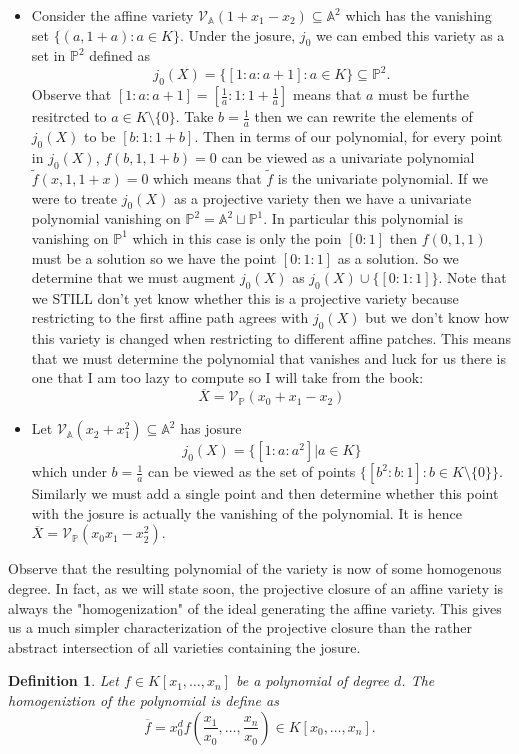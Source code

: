 \documentclass[40pt]{article}
\newtheorem{definition}{Definition}[section]
\newcommand{\Proj}{\mathbb{P}}
\newcommand{\A}{\mathbb{A}}
\newcommand{\V}{\mathcal{V}}
\theoremstyle{remark}
\begin{document}
	\begin{itemize}
		\item Consider the affine variety $\V_\A(1+x_1-x_2) \subseteq \A^2$ which has the vanishing set $\{(a,1+a)  : a \in K\}$. Under the josure, $j_0$ we can embed this variety as a set in $\Proj^2$ defined as
		\[
		j_0(X) = \{[1:a:a+1] : a \in K\} \subseteq \Proj^2.
		\]
		Observe that $[1:a:a+1] = [\frac{1}{a}:1:1 + \frac{1}{a}]$ means that $a$ must be furthe resitrcted to $a \in K\setminus \{0\}$. Take $b = \frac{1}{a}$ then we can rewrite the elements of $j_0(X)$ to be $[b:1:1+b]$. Then in terms of our polynomial, for every point in $j_0(X)$, $f(b,1,1+b) = 0$ can be viewed as a univariate polynomial $\tilde f (x,1,1+x) = 0$ which means that $\tilde f $ is the univariate polynomial. If we were to treate $j_0(X)$ as a projective variety then we have a univariate polynomial vanishing on $\Proj^2 = \A^2 \sqcup \Proj^1$. In particular this polynomial is vanishing on $\Proj^1$ which in this case is
		only the poin $[0:1]$ then $f(0,1,1)$ must be a solution so we have the point $[0:1:1]$ as a solution. So we determine that we must augment $j_0(X)$ as $j_0(X) \cup \{[0:1:1]\}$. Note that we STILL don't yet know whether this is a projective variety because restricting to the first affine path agrees with $j_0(X)$ but we don't know how this variety is changed when restricting to different affine patches. This means that we must determine the polynomial that vanishes and luck for us there is one that I am too lazy to compute so I will take from the book:
		\[\overline X = \V_\Proj(x_0+x_1 - x_2) \]
		\item Let $\V_\A(x_2  +x_1^2) \subseteq\A^2$ has josure
		\[
		j_0(X) = \{[1:a:a^2] | a \in K\}
		\]
		which under $b = \frac{1}{a}$ can be viewed as the set of points $\{[b^2:b:1] : b \in K\setminus \{0\}\}$. Similarly we must add a single point and then determine whether this point with the josure is actually the vanishing of the polynomial. It is hence $\overline X = \V_\Proj(x_0x_1 - x_2^2)$.
		\end{itemize}
		Observe that the resulting polynomial of the variety is now of some homogenous degree. In fact, as we will state soon, the projective closure of an affine variety is always the "homogenization" of the ideal generating the affine variety. This gives us a much simpler characterization of the projective closure than the rather abstract intersection of all varieties containing the josure. 
		\begin{definition}
			Let $f \in K[x_1,\dots,x_n]$ be a polynomial of degree $d$. The homogeniztion of the polynomial is define as 
			\[
			\overline f = x_0^df(\frac{x_1}{x_0}, \dots, \frac{x_n}{x_0}) \in K[x_0,\dots,x_n].
			\]
		\end{definition}
\end{document}
